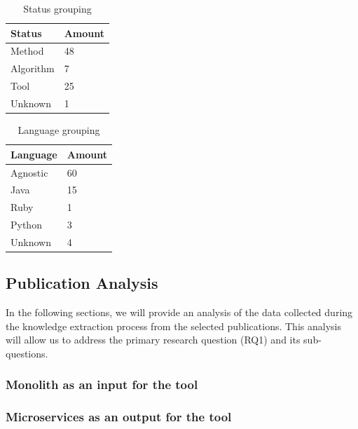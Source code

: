 \documentclass[conference]{IEEEtran}
\begin{document}
\begin{table}[!htb] \caption{Status grouping} \label{tab:status-grouping}
  \begin{center}
    \begin{tabular}[c]{p{12em}|p{4em}}
      \textbf{Status} &
      \textbf{Amount} \\
      \hline Method & {48} \\
      \hline Algorithm & {7} \\
      \hline Tool & {25} \\
      \hline Unknown & {1} \\
    \end{tabular}
  \end{center}
\end{table}

\begin{table}[!htb] \caption{Language grouping} \label{tab:language-grouping}
  \begin{center}
    \begin{tabular}[c]{p{12em}|p{4em}}
      \textbf{Language} &
      \textbf{Amount} \\
      \hline Agnostic & {60} \\
      \hline Java & {15} \\
      \hline Ruby & {1} \\
      \hline Python & {3} \\
      \hline Unknown & {4} \\
    \end{tabular}
  \end{center}
\end{table}

\subsection{Publication Analysis}

In the following sections, we will provide an analysis of the data collected
during the knowledge extraction process from the selected publications. This
analysis will allow us to address the primary research question (RQ1) and its
sub-questions.

\subsubsection{Monolith as an input for the tool}

\subsubsection{Microservices as an output for the tool}
\end{document}
